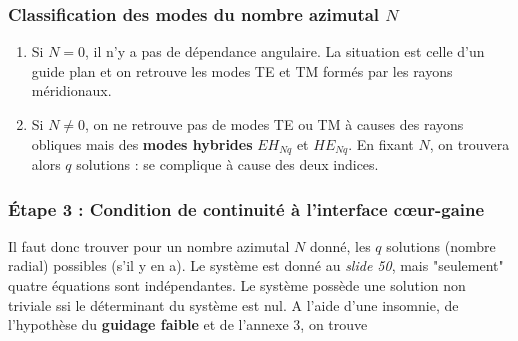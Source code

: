 \subsubsection{Classification des modes du nombre azimutal $N$}
\begin{enumerate}
\item Si $N=0$, il n'y a pas de dépendance angulaire. La situation est celle d'un guide plan et on retrouve les modes TE et TM formés par les rayons méridionaux.
\item Si $N\neq 0$, on ne retrouve pas de modes TE ou TM à causes des rayons obliques mais des \textbf{modes hybrides} $EH_{Nq}$ et $HE_{Nq}$. En fixant $N$, on trouvera alors $q$ solutions : se complique à cause des deux indices.
\end{enumerate}

\subsubsection{Étape 3 : Condition de continuité à l'interface cœur-gaine}
Il faut donc trouver pour un nombre azimutal $N$ donné, les $q$ solutions (nombre radial) possibles (s'il y en a). Le système est donné au \textit{slide 50}, mais "seulement" quatre équations sont indépendantes. Le système possède une solution non triviale ssi le déterminant du système est nul. A l'aide d'une insomnie, de l'hypothèse du \textbf{guidage faible} et de l'annexe 3, on trouve\\








